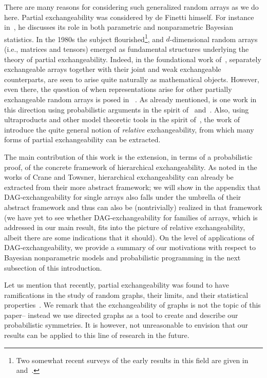 \documentclass[AHL,Unicode,longabstracts,published]{cedram}
\begin{document}
There are many reasons for considering such generalized random arrays as we do here. Partial exchangeability was considered by de Finetti himself. For instance in~\cite[Chapter~12]{de1975theory}, he discusses its role in both parametric and nonparametric Bayesian statistics. In the 1980s the subject flourished\footnote{Two somewhat recent surveys of the early results in this field are given in~\cite{austin2012exchangeable} and~\cite{aldous2009more}.}, and $d$-dimensional random arrays (i.e., matrices and tensors) emerged as fundamental structures underlying the theory of partial exchangeability. Indeed, in the foundational work of~\cite{hoover1979relations}, separately exchangeable arrays together with their joint and weak exchangeable counterparts, are seen to arise quite naturally as mathematical objects. However, even there, the question of when representations arise for other partially exchangeable random arrays is posed in~\cite[Section~7]{hoover1979relations} . As already mentioned, \cite{austin:panchenko:2014} is one work in this direction using probabilistic arguments in the spirit of~\cite{aldous1981representations} and~\cite{kallenberg2006probabilistic}. Also, using ultraproducts and other model theoretic tools in the spirit of~\cite{hoover1979relations}, the work of~\cite{crane2017relative, crane2018relatively} introduce the quite general notion of \emph{relative} exchangeability, from which many forms of partial exchangeability can be extracted.

The main contribution of this work is the extension, in terms of a probabilistic proof, of the concrete framework of hierarchical exchangeability. As noted in the works of Crane and Towsner, hierarchical exchangeability can already be extracted from their more abstract framework; we will show in the appendix that DAG-exchangeability for single arrays also falls under the umbrella of their abstract framework and thus can also be (nontrivially) realized in that framework (we have yet to see whether DAG-exchangeability for families of arrays, which is addressed in our main result, fits into the picture of relative exchangeability, albeit there are some indications that it should). On the level of applications of DAG-exchangeability, we provide a summary of our motivations with respect to Bayesian nonparametric models and probabilistic programming in the next subsection of this introduction.

Let us mention that recently, partial exchangeability was found to have ramifications in the study of random graphs, their limits, and their statistical properties~\cite{austin2008exchangeable,caicampbellbroderick2016edge, caron2017sparse, crane2018edge, diaconis2008graph, veitchroy2015sparse}. We remark that the exchangeability of graphs is not the topic of this paper-- instead we use directed graphs as a tool to create and describe our probabilistic symmetries. It is however, not unreasonable to envision that our results can be applied to this line of research in the future.
\end{document}
